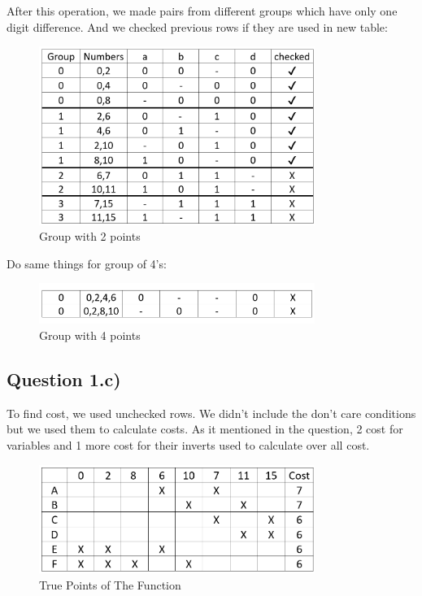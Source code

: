 \documentclass[pdftex,12pt,a4paper]{article}
\begin{document}
After this operation, we made pairs from different groups which have only one digit difference. And we checked previous rows if they are used in new table:


   \begin{figure}[H]
    	\centering
    	\includegraphics[width=0.8\textwidth]{preliminary/group_of_two.png}	
    	\caption{Group with 2 points}
    	\label{Group with 2 points}
    \end{figure}

Do same things for group of 4's: 
   \begin{figure}[H]
    	\centering
    	\includegraphics[width=0.8\textwidth]{preliminary/group_of_four.png}	
    	\caption{Group with 4 points}
    	\label{Group with 4 points}
    \end{figure}

    
\subsection{Question 1.c)}

    To find cost, we used unchecked  rows. We didn't include the don't care conditions but we used them to calculate costs. As it mentioned in the question, 2 cost for variables and 1 more cost for their inverts used to calculate over all cost.
   \begin{figure}[H]
    	\centering
    	\includegraphics[width=0.8\textwidth]{preliminary/true_points.png}	
    	\caption{True Points of The Function}
    	\label{True Points of The Function}
    \end{figure}
\end{document}
